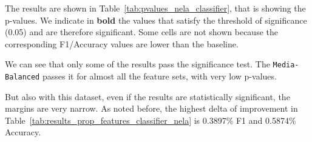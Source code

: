 The results are shown in Table~\ref{tab:pvalues_nela_classifier}, that is showing the p-values. We indicate in \textbf{bold} the values that satisfy the threshold of significance (0.05) and are therefore significant. Some cells are not shown because the corresponding F1/Accuracy values are lower than the baseline.

We can see that only some of the results pass the significance test. The \texttt{Media-Balanced} passes it for almost all the feature sets, with very low p-values. 









 

But also with this dataset, even if the results are statistically significant, the margins are very narrow.
As noted before, the highest delta of improvement in Table~\ref{tab:results_prop_features_classifier_nela} is 0.3897\% F1 and 0.5874\% Accuracy.

